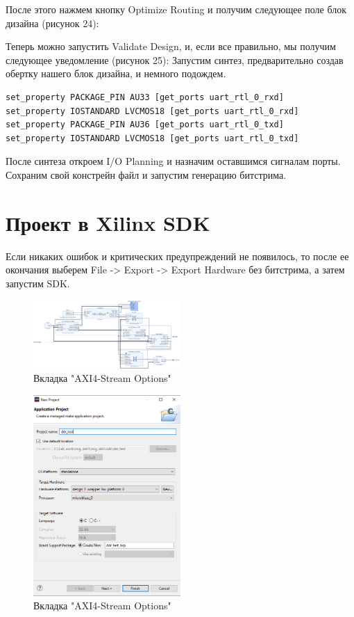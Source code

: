 \documentclass[a4paper,oneside ,14pt]{extreport}
\begin{document}
    После этого нажмем кнопку Optimize Routing и получим следующее поле блок дизайна (рисунок 24):

    Теперь можно запустить Validate Design, и, если все правильно, мы получим следующее уведомление (рисунок 25):
    Запустим синтез, предварительно создав обертку нашего блок дизайна, и немного подождем.

\begin{Verbatim}[tabsize=4]
set_property PACKAGE_PIN AU33 [get_ports uart_rtl_0_rxd]
set_property IOSTANDARD LVCMOS18 [get_ports uart_rtl_0_rxd]
set_property PACKAGE_PIN AU36 [get_ports uart_rtl_0_txd]
set_property IOSTANDARD LVCMOS18 [get_ports uart_rtl_0_txd]
\end{Verbatim}

    После синтеза откроем I/O Planning и назначим оставшимся сигналам порты. Сохраним свой констрейн файл и запустим генерацию битстрима. 

\section{Проект в Xilinx SDK}
    Если никаких ошибок и критических предупреждений не появилось, то после ее окончания выберем File -> Export -> Export Hardware без битстрима, а затем запустим SDK.
\begin{figure}[h]
	\centering
	\includegraphics[width=0.5\textwidth]{image/mig_m_4.png}
	\caption{Вкладка "AXI4-Stream Options"}
	\label{mig_m_4}
\end{figure}

\begin{figure}[h]
	\centering
	\includegraphics[width=0.5\textwidth]{image/mig_m_sdk_0.png}
	\caption{Вкладка "AXI4-Stream Options"}
	\label{mig_m_sdk_0}
\end{figure}
\end{document}
